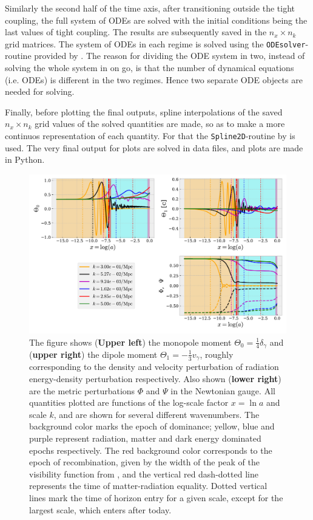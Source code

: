 \documentclass[twocolumn]{aastex62}
\begin{document}
Similarly the second half of the time axis, after transitioning outside the tight coupling, the full system of ODEs are solved with the initial conditions being the last values of tight coupling. The results are subsequently saved in the $n_x\times n_k$ grid matrices. The system of ODEs in each regime is solved using the \texttt{ODEsolver}-routine provided by \cite{winther:2020b}. The reason for dividing the ODE system in two, instead of solving the whole system in on go, is that the number of dynamical equations (i.e. ODEs) is different in the two regimes. Hence two separate ODE objects are needed for solving. 

Finally, before plotting the final outputs, spline interpolations of the saved $n_x\times n_k$ grid values of the solved quantities are made, so as to make a more continuos representation of each quantity. For that the \texttt{Spline2D}-routine by \cite{winther:2020b} is used. The very final output for plots are solved in data files, and plots are made in Python.



\begin{figure}
    \includegraphics[scale = 0.65]{Figures/fig1.pdf}
    \caption{The figure shows (\textbf{Upper left}) the monopole moment $\Theta_0 = \frac{1}{4}\delta_\gamma$ and (\textbf{upper right}) the dipole moment $\Theta_1 = -\frac{1}{3}v_\gamma$, roughly corresponding to the density and velocity perturbation of radiation energy-density perturbation respectively. Also shown (\textbf{lower right}) are the metric perturbations $\Phi$ and $\Psi$ in the Newtonian gauge. All quantities plotted are functions of the log-scale factor $x = \ln a$ and scale $k$, and are shown for several different wavenumbers. The background color marks the epoch of dominance; yellow, blue and purple represent radiation, matter and dark energy dominated epochs respectively. The red background color corresponds to the epoch of recombination, given by the width of the peak of the visibility function from \cite{stutzer:2020b}, and the vertical red dash-dotted line represents the time of matter-radiation equality. Dotted vertical lines mark the time of horizon entry for a given scale, except for the largest scale, which enters after today.} 
    \label{fig:fig1}
\end{figure}
\end{document}
